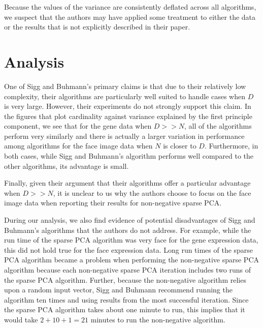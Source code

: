 \documentclass[twocolumn]{article}
\begin{document}
Because the values of the variance are consistently deflated
across all algorithms, we suspect that the authors may have
applied some treatment to either the data or the results
that is not explicitly described in their paper.




\section{Analysis}

One of Sigg and Buhmann's primary claims is that due to their
relatively low complexity, their algorithms are particularly
well suited to handle cases when $D$ is very large.
However, their experiments do not strongly support this claim.
In the figures that plot cardinality against variance
explained by the first principle component, we see that for the
gene data when $D >> N$, all of the algorithms perform very
similarly and there is actually a larger variation in performance
among algorithms for the face image data when $N$ is closer to $D$.
Furthermore, in both cases, while Sigg and Buhmann's algorithm
performs well compared to the other algorithms, its advantage is small.


Finally, given their argument that their algorithms offer a particular
advantage when $D >> N$, it is unclear to us why the authors choose
to focus on the face image data when reporting their results for
non-negative sparse PCA.

During our analysis, we also find evidence of potential disadvantages
of Sigg and Buhmann's algorithms that the authors do not address.
For example, while the run time of the sparse PCA algorithm was
very face for the gene expression data, this did not hold true for
the face expression data. Long run times of the sparse PCA algorithm
became a problem when performing the non-negative sparse PCA algorithm
because each non-negative sparse PCA iteration includes two runs
of the sparse PCA algorithm. Further, because the non-negative
algorithm relies upon a random input vector, Sigg and Buhmann
recommend running the algorithm ten times and using results from
the most successful iteration. Since the sparse PCA algorithm takes
about one minute to run, this implies that it would take $2+10+1=21$
minutes to run the non-negative algorithm.
\end{document}
